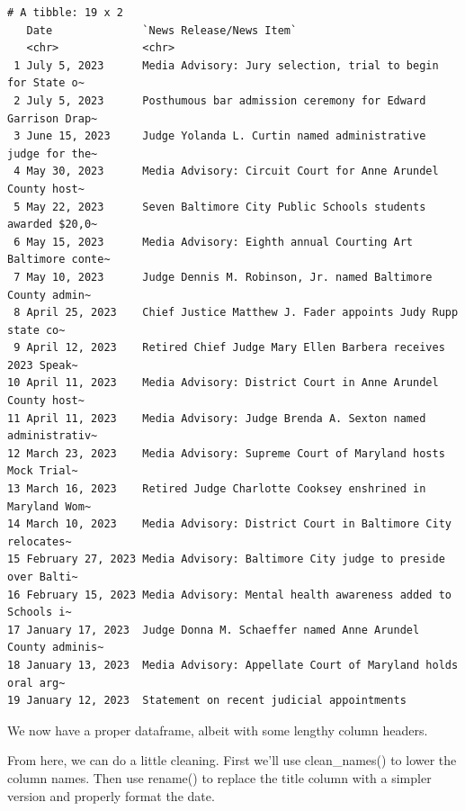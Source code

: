 \documentclass[
  letterpaper,
  DIV=11,
  numbers=noendperiod]{scrreprt}
\begin{document}
\begin{verbatim}
# A tibble: 19 x 2
   Date              `News Release/News Item`                                   
   <chr>             <chr>                                                      
 1 July 5, 2023      Media Advisory: Jury selection, trial to begin for State o~
 2 July 5, 2023      Posthumous bar admission ceremony for Edward Garrison Drap~
 3 June 15, 2023     Judge Yolanda L. Curtin named administrative judge for the~
 4 May 30, 2023      Media Advisory: Circuit Court for Anne Arundel County host~
 5 May 22, 2023      Seven Baltimore City Public Schools students awarded $20,0~
 6 May 15, 2023      Media Advisory: Eighth annual Courting Art Baltimore conte~
 7 May 10, 2023      Judge Dennis M. Robinson, Jr. named Baltimore County admin~
 8 April 25, 2023    Chief Justice Matthew J. Fader appoints Judy Rupp state co~
 9 April 12, 2023    Retired Chief Judge Mary Ellen Barbera receives 2023 Speak~
10 April 11, 2023    Media Advisory: District Court in Anne Arundel County host~
11 April 11, 2023    Media Advisory: Judge Brenda A. Sexton named administrativ~
12 March 23, 2023    Media Advisory: Supreme Court of Maryland hosts Mock Trial~
13 March 16, 2023    Retired Judge Charlotte Cooksey enshrined in  Maryland Wom~
14 March 10, 2023    Media Advisory: District Court in Baltimore City relocates~
15 February 27, 2023 Media Advisory: Baltimore City judge to preside over Balti~
16 February 15, 2023 Media Advisory: Mental health awareness added to Schools i~
17 January 17, 2023  Judge Donna M. Schaeffer named Anne Arundel County adminis~
18 January 13, 2023  Media Advisory: Appellate Court of Maryland holds oral arg~
19 January 12, 2023  Statement on recent judicial appointments                  
\end{verbatim}

We now have a proper dataframe, albeit with some lengthy column headers.

From here, we can do a little cleaning. First we'll use clean\_names()
to lower the column names. Then use rename() to replace the title column
with a simpler version and properly format the date.
\end{document}
